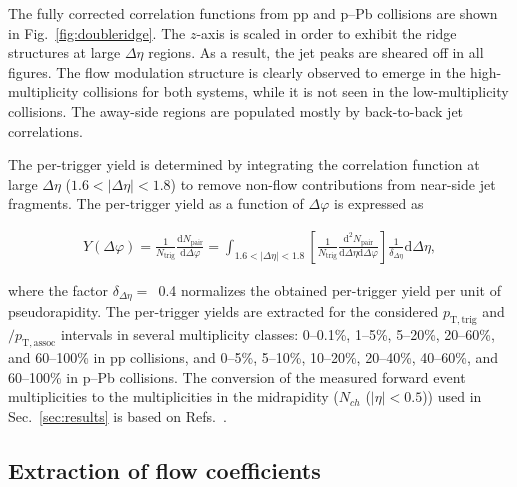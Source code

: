 The fully corrected correlation functions from pp and p--Pb collisions are shown in Fig.~\ref{fig:doubleridge}. 
The $z$-axis is scaled in order to exhibit the ridge structures at large $\Delta\eta$ regions. As a result, the jet peaks are sheared off in all figures. The flow modulation structure is clearly observed to emerge in the high-multiplicity collisions for both systems, while it is not seen in the low-multiplicity collisions. The away-side regions are populated mostly by back-to-back jet correlations. 

The per-trigger yield is determined by integrating the correlation function at large $\Delta\eta$ ($1.6<|\Delta\eta|<1.8$) to remove non-flow contributions from near-side jet fragments.
The per-trigger yield as a function of $\Delta\varphi$ is expressed as

\begin{eqnarray}
Y(\Delta\varphi) = \frac{1}{N_{\mathrm{trig}}} \frac{\mathrm{d} N_{\mathrm{pair}}}{\mathrm{d}\Delta\varphi} = \int_{1.6<|\Delta \eta|<1.8} \left[\frac{1}{N_{\mathrm{trig}}} \frac{\mathrm{d}^{2}N_{\mathrm{pair}}}{\mathrm{d}\Delta\eta \mathrm{d}\Delta\varphi}\right] \frac{1}{\delta_{\Delta\eta}} \mathrm{d}\Delta \eta,
\label{eq:pertrigger}
\end{eqnarray}

where the factor $\delta_{\Delta\eta}=$~0.4 normalizes the obtained per-trigger yield per unit of pseudorapidity.
The per-trigger yields are extracted for the considered $p_{\mathrm{T,trig}}$ and $/p_{\mathrm{T,assoc}}$ intervals in several multiplicity classes: 0--0.1\%, 1--5\%, 5--20\%, 20--60\%, and 60--100\% in pp collisions, and 0--5\%, 5--10\%, 10--20\%, 20--40\%, 40--60\%, and 60--100\% in p--Pb collisions. The conversion of the measured forward event multiplicities to the multiplicities in the midrapidity ($N_{ch}$ ($|\eta|<0.5$)) used in Sec.~\ref{sec:results} is based on Refs.~\cite{ALICE:2020swj}.

\subsection{Extraction of flow coefficients}


